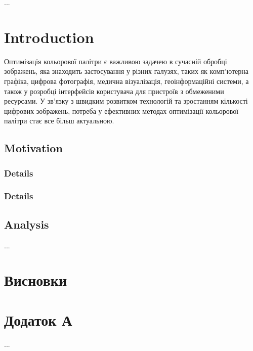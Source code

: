 \documentclass[
14pt,
candidate, %
subf, %
]{article}
\begin{document}




\newpage



\tableofcontents

\newpage



...

\section{Introduction}

Оптимізація кольорової палітри є важливою задачею в сучасній обробці
зображень, яка знаходить застосування у різних галузях, таких як комп'ютерна
графіка, цифрова фотографія, медична візуалізація, геоінформаційні системи, а
також у розробці інтерфейсів користувача для пристроїв з обмеженими
ресурсами. У зв'язку з швидким розвитком технологій та зростанням кількості
цифрових зображень, потреба у ефективних методах оптимізації кольорової
палітри стає все більш актуальною.

\subsection{Motivation}

\cite{linal}

\subsubsection{Details}

\subsubsection{Details}

\subsection{Analysis}

...

\newpage

\section*{Висновки}

\newpage




\newpage

\appendix
\section*{Додаток А}
...
\end{document}
